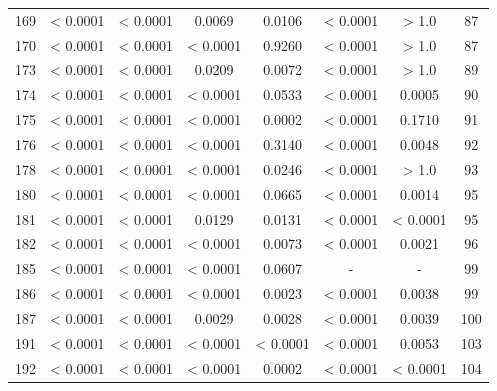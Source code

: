 {\begin{longtable}{cccccccc}
169 & {\color{red} < 0.0001} & {\color{red} < 0.0001} & {\color{red}0.0069} & {\color{red}0.0106} & {\color{red} < 0.0001} & > 1.0 & 87 \\
170 & {\color{red} < 0.0001} & {\color{red} < 0.0001} & {\color{red} < 0.0001} & 0.9260 & {\color{red} < 0.0001} & > 1.0 & 87 \\
173 & {\color{red} < 0.0001} & {\color{red} < 0.0001} & {\color{red}0.0209} & {\color{red}0.0072} & {\color{red} < 0.0001} & > 1.0 & 89 \\
174 & {\color{red} < 0.0001} & {\color{red} < 0.0001} & {\color{red} < 0.0001} & 0.0533 & {\color{red} < 0.0001} & {\color{red}0.0005} & 90 \\
175 & {\color{red} < 0.0001} & {\color{red} < 0.0001} & {\color{red} < 0.0001} & {\color{red}0.0002} & {\color{red} < 0.0001} & 0.1710 & 91 \\
176 & {\color{red} < 0.0001} & {\color{red} < 0.0001} & {\color{red} < 0.0001} & 0.3140 & {\color{red} < 0.0001} & {\color{red}0.0048} & 92 \\
178 & {\color{red} < 0.0001} & {\color{red} < 0.0001} & {\color{red} < 0.0001} & {\color{red}0.0246} & {\color{red} < 0.0001} & > 1.0 & 93 \\
180 & {\color{red} < 0.0001} & {\color{red} < 0.0001} & {\color{red} < 0.0001} & 0.0665 & {\color{red} < 0.0001} & {\color{red}0.0014} & 95 \\
181 & {\color{red} < 0.0001} & {\color{red} < 0.0001} & {\color{red}0.0129} & {\color{red}0.0131} & {\color{red} < 0.0001} & {\color{red} < 0.0001} & 95 \\
182 & {\color{red} < 0.0001} & {\color{red} < 0.0001} & {\color{red} < 0.0001} & {\color{red}0.0073} & {\color{red} < 0.0001} & {\color{red}0.0021} & 96 \\
185 & {\color{red} < 0.0001} & {\color{red} < 0.0001} & {\color{red} < 0.0001} & 0.0607 & - & - & 99 \\
186 & {\color{red} < 0.0001} & {\color{red} < 0.0001} & {\color{red} < 0.0001} & {\color{red}0.0023} & {\color{red} < 0.0001} & {\color{red}0.0038} & 99 \\
187 & {\color{red} < 0.0001} & {\color{red} < 0.0001} & {\color{red}0.0029} & {\color{red}0.0028} & {\color{red} < 0.0001} & {\color{red}0.0039} & 100 \\
191 & {\color{red} < 0.0001} & {\color{red} < 0.0001} & {\color{red} < 0.0001} & {\color{red} < 0.0001} & {\color{red} < 0.0001} & {\color{red}0.0053} & 103 \\
192 & {\color{red} < 0.0001} & {\color{red} < 0.0001} & {\color{red} < 0.0001} & {\color{red}0.0002} & {\color{red} < 0.0001} & {\color{red} < 0.0001} & 104 \\

\end{longtable}}

